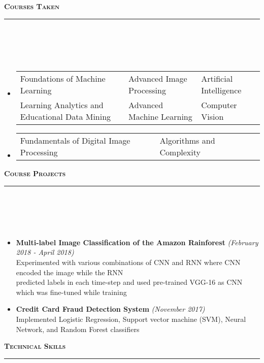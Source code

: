 \documentclass[a4paper,10pt]{article}
\newcommand{\lsep}{-0.5cm}
\newcommand{\resheading}[1]{{\small
        {
            \begin{minipage}
                {0.992\textwidth}\textbf{{\textsc{#1 \vphantom{p\^{E}} }}}
                \\[-0.3cm]
                \hrule
            \end{minipage}
            \\[-0.5cm]
        }
 }}
\begin{document}
\resheading{\textbf{\large Courses Taken }}\\[\lsep]
\\[-0.3cm]
\begin{itemize}
    \item[] \begin{tabular}{p{8cm}p{5cm}l }
    Foundations of Machine Learning & Advanced Image Processing  & Artificial Intelligence\\ 
    Learning Analytics and Educational Data Mining & Advanced Machine Learning   &  Computer Vision
    \end{tabular}
    \vspace{-0.25cm}
    \item[] \begin{tabular}{p{8cm}p{5cm}l }
    Fundamentals of Digital Image Processing & Algorithms and Complexity
    \end{tabular}
\end{itemize}
\vspace{-0.1cm}
\resheading{\textbf{\large Course Projects}}\\[\lsep]
\\[-0.35cm]
\begin{itemize}
\item \textbf{Multi-label Image Classification of the Amazon Rainforest}   \hfill {\emph{(February 2018 - April 2018)}} \\
Experimented with various combinations of CNN and RNN where CNN encoded the image while the RNN \\predicted labels in each time-step and used pre-trained VGG-16 as CNN which was fine-tuned while training \\[-0.6cm]
\item \textbf{Credit Card Fraud Detection System} \hfill {\emph{(November 2017)}}\\
Implemented Logistic Regression,
Support vector machine (SVM), Neural Network, and Random Forest classifiers  \\[-0.5cm]
\end{itemize}
\resheading{\textbf{\large Technical Skills}}\\[\lsep] 
\end{document}
